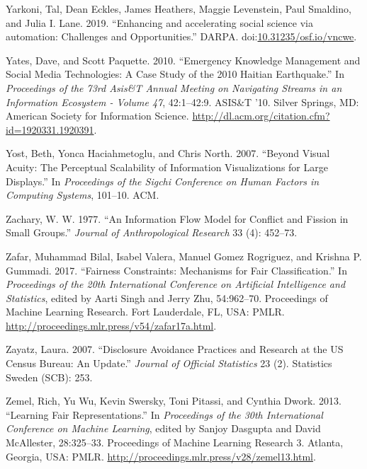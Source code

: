 \documentclass[]{krantz}
\begin{document}
\hypertarget{ref-Yarkoni2019}{}
Yarkoni, Tal, Dean Eckles, James Heathers, Maggie Levenstein, Paul
Smaldino, and Julia I. Lane. 2019. ``Enhancing and accelerating social
science via automation: Challenges and Opportunities.'' DARPA.
doi:\href{https://doi.org/10.31235/osf.io/vncwe}{10.31235/osf.io/vncwe}.

\hypertarget{ref-yates-10}{}
Yates, Dave, and Scott Paquette. 2010. ``Emergency Knowledge Management
and Social Media Technologies: A Case Study of the 2010 Haitian
Earthquake.'' In \emph{Proceedings of the 73rd Asis\&T Annual Meeting on
Navigating Streams in an Information Ecosystem - Volume 47}, 42:1--42:9.
ASIS\&T '10. Silver Springs, MD: American Society for Information
Science. \url{http://dl.acm.org/citation.cfm?id=1920331.1920391}.

\hypertarget{ref-yost2007beyond}{}
Yost, Beth, Yonca Haciahmetoglu, and Chris North. 2007. ``Beyond Visual
Acuity: The Perceptual Scalability of Information Visualizations for
Large Displays.'' In \emph{Proceedings of the Sigchi Conference on Human
Factors in Computing Systems}, 101--10. ACM.

\hypertarget{ref-zachary1977}{}
Zachary, W. W. 1977. ``An Information Flow Model for Conflict and
Fission in Small Groups.'' \emph{Journal of Anthropological Research} 33
(4): 452--73.

\hypertarget{ref-zafar2017}{}
Zafar, Muhammad Bilal, Isabel Valera, Manuel Gomez Rogriguez, and
Krishna P. Gummadi. 2017. ``Fairness Constraints: Mechanisms for Fair
Classification.'' In \emph{Proceedings of the 20th International
Conference on Artificial Intelligence and Statistics}, edited by Aarti
Singh and Jerry Zhu, 54:962--70. Proceedings of Machine Learning
Research. Fort Lauderdale, FL, USA: PMLR.
\url{http://proceedings.mlr.press/v54/zafar17a.html}.

\hypertarget{ref-zayatz2007disclosure}{}
Zayatz, Laura. 2007. ``Disclosure Avoidance Practices and Research at
the US Census Bureau: An Update.'' \emph{Journal of Official Statistics}
23 (2). Statistics Sweden (SCB): 253.

\hypertarget{ref-zemel2013}{}
Zemel, Rich, Yu Wu, Kevin Swersky, Toni Pitassi, and Cynthia Dwork.
2013. ``Learning Fair Representations.'' In \emph{Proceedings of the
30th International Conference on Machine Learning}, edited by Sanjoy
Dasgupta and David McAllester, 28:325--33. Proceedings of Machine
Learning Research 3. Atlanta, Georgia, USA: PMLR.
\url{http://proceedings.mlr.press/v28/zemel13.html}.
\end{document}
